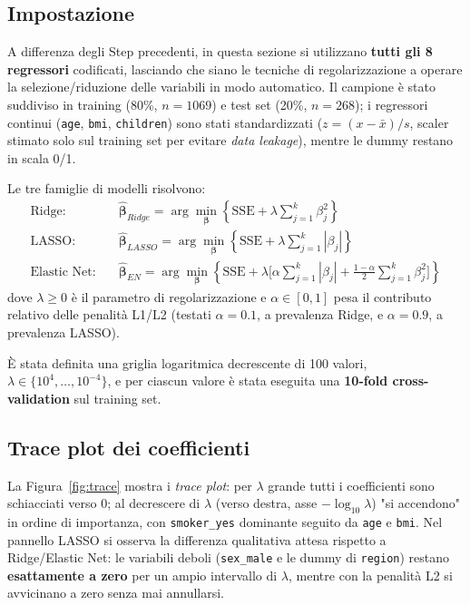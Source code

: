 \documentclass[11pt,a4paper]{article}
\begin{document}
\subsection{Impostazione}
A differenza degli Step precedenti, in questa sezione si utilizzano
\textbf{tutti gli 8 regressori} codificati, lasciando che siano le
tecniche di regolarizzazione a operare la selezione/riduzione delle
variabili in modo automatico. Il campione è stato suddiviso in training
(80\%, $n=1069$) e test set (20\%, $n=268$); i regressori continui
(\texttt{age}, \texttt{bmi}, \texttt{children}) sono stati standardizzati
($z=(x-\bar x)/s$, scaler stimato solo sul training set per evitare
\emph{data leakage}), mentre le dummy restano in scala 0/1.

Le tre famiglie di modelli risolvono:
\begin{align}
\text{Ridge:} \quad & \hat{\boldsymbol\beta}_{Ridge} = \arg\min_{\boldsymbol\beta} \left\{ \mathrm{SSE} + \lambda\sum_{j=1}^k \beta_j^2 \right\} \\
\text{LASSO:} \quad & \hat{\boldsymbol\beta}_{LASSO} = \arg\min_{\boldsymbol\beta} \left\{ \mathrm{SSE} + \lambda\sum_{j=1}^k |\beta_j| \right\} \\
\text{Elastic Net:} \quad & \hat{\boldsymbol\beta}_{EN} = \arg\min_{\boldsymbol\beta} \left\{ \mathrm{SSE} + \lambda\Big[\alpha\sum_{j=1}^k |\beta_j| + \tfrac{1-\alpha}{2}\sum_{j=1}^k \beta_j^2\Big] \right\}
\end{align}
dove $\lambda\geq0$ è il parametro di regolarizzazione e
$\alpha\in[0,1]$ pesa il
contributo relativo delle penalità L1/L2 (testati $\alpha=0.1$, a
prevalenza Ridge, e $\alpha=0.9$, a prevalenza LASSO).

È stata definita una griglia logaritmica decrescente di 100 valori,
$\lambda\in\{10^{4},\dots,10^{-4}\}$, e per ciascun valore è stata
eseguita una \textbf{10-fold cross-validation} sul training set.

\subsection{Trace plot dei coefficienti}
La Figura~\ref{fig:trace} mostra i \emph{trace plot}: per $\lambda$ grande
tutti i coefficienti sono schiacciati verso 0; al decrescere di $\lambda$
(verso destra, asse $-\log_{10}\lambda$) "si accendono" in ordine di
importanza, con \texttt{smoker\_yes} dominante seguito da \texttt{age} e
\texttt{bmi}. Nel pannello LASSO si osserva la differenza qualitativa
attesa rispetto a Ridge/Elastic Net: le variabili deboli (\texttt{sex\_male}
e le dummy di \texttt{region}) restano \textbf{esattamente a zero} per un
ampio intervallo di $\lambda$, mentre con la penalità L2 si
avvicinano a zero senza mai annullarsi.
\end{document}
